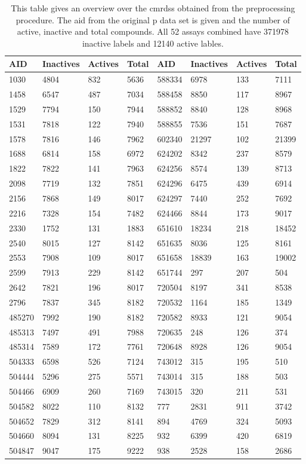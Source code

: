 \begin{table}[H]
	\centering
	\caption[Overview over the Combined Machine Learning Ready Data Sets]{This table gives an overview over the \aclp{cmrds} obtained from the preprocessing procedure. The \ac{aid} from the original \acl{p} data set is given and the number of active, inactive and total compounds. All \num{52} assays combined have \num{371978} inactive labels and \num{12140} active lables.}
	\label{tab:assayoverview}
	\begin{tabularx}{\textwidth}{lllXllll}
		\toprule
		AID & Inactives & Actives & Total & AID & Inactives & Actives & Total\\
		\midrule
		1030 & 4804 & 832 & 5636 & 588334 & 6978 & 133 & 7111 \\
		1458 & 6547 & 487 & 7034 & 588458 & 8850 & 117 & 8967 \\
		1529 & 7794 & 150 & 7944 & 588852 & 8840 & 128 & 8968 \\
		1531 & 7818 & 122 & 7940 & 588855 & 7536 & 151 & 7687 \\
		1578 & 7816 & 146 & 7962 & 602340 & 21297 & 102 & 21399 \\
		1688 & 6814 & 158 & 6972 & 624202 & 8342 & 237 & 8579 \\
		1822 & 7822 & 141 & 7963 & 624256 & 8574 & 139 & 8713 \\
		2098 & 7719 & 132 & 7851 & 624296 & 6475 & 439 & 6914 \\
		2156 & 7868 & 149 & 8017 & 624297 & 7440 & 252 & 7692 \\
		2216 & 7328 & 154 & 7482 & 624466 & 8844 & 173 & 9017 \\
		2330 & 1752 & 131 & 1883 & 651610 & 18234 & 218 & 18452 \\
		2540 & 8015 & 127 & 8142 & 651635 & 8036 & 125 & 8161 \\
		2553 & 7908 & 109 & 8017 & 651658 & 18839 & 163 & 19002 \\
		2599 & 7913 & 229 & 8142 & 651744 & 297 & 207 & 504 \\
		2642 & 7821 & 196 & 8017 & 720504 & 8197 & 341 & 8538 \\
		2796 & 7837 & 345 & 8182 & 720532 & 1164 & 185 & 1349 \\
		485270 & 7992 & 190 & 8182 & 720582 & 8933 & 121 & 9054 \\
		485313 & 7497 & 491 & 7988 & 720635 & 248 & 126 & 374 \\
		485314 & 7589 & 172 & 7761 & 720648 & 8928 & 126 & 9054 \\
		504333 & 6598 & 526 & 7124 & 743012 & 315 & 195 & 510 \\
		504444 & 5296 & 275 & 5571 & 743014 & 315 & 188 & 503 \\
		504466 & 6909 & 260 & 7169 & 743015 & 320 & 211 & 531 \\
		504582 & 8022 & 110 & 8132 & 777 & 2831 & 911 & 3742 \\
		504652 & 7829 & 312 & 8141 & 894 & 4769 & 324 & 5093 \\
		504660 & 8094 & 131 & 8225 & 932 & 6399 & 420 & 6819 \\
		504847 & 9047 & 175 & 9222 & 938 & 2528 & 158 & 2686 \\
		\bottomrule
	\end{tabularx}
\end{table}\noindent
%
%
